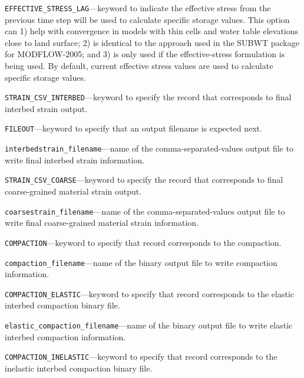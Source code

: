 \begin{description}
\item \texttt{EFFECTIVE\_STRESS\_LAG}---keyword to indicate the effective stress from the previous time step will be used to calculate specific storage values. This option can 1) help with convergence in models with thin cells and water table elevations close to land surface; 2) is identical to the approach used in the SUBWT package for MODFLOW-2005; and 3) is only used if the effective-stress formulation is being used. By default, current effective stress values are used to calculate specific storage values.

\item \texttt{STRAIN\_CSV\_INTERBED}---keyword to specify the record that corresponds to final interbed strain output.

\item \texttt{FILEOUT}---keyword to specify that an output filename is expected next.

\item \texttt{interbedstrain\_filename}---name of the comma-separated-values output file to write final interbed strain information.

\item \texttt{STRAIN\_CSV\_COARSE}---keyword to specify the record that corresponds to final coarse-grained material strain output.

\item \texttt{coarsestrain\_filename}---name of the comma-separated-values output file to write final coarse-grained material strain information.

\item \texttt{COMPACTION}---keyword to specify that record corresponds to the compaction.

\item \texttt{compaction\_filename}---name of the binary output file to write compaction information.

\item \texttt{COMPACTION\_ELASTIC}---keyword to specify that record corresponds to the elastic interbed compaction binary file.

\item \texttt{elastic\_compaction\_filename}---name of the binary output file to write elastic interbed compaction information.

\item \texttt{COMPACTION\_INELASTIC}---keyword to specify that record corresponds to the inelastic interbed compaction binary file.


\end{description}
